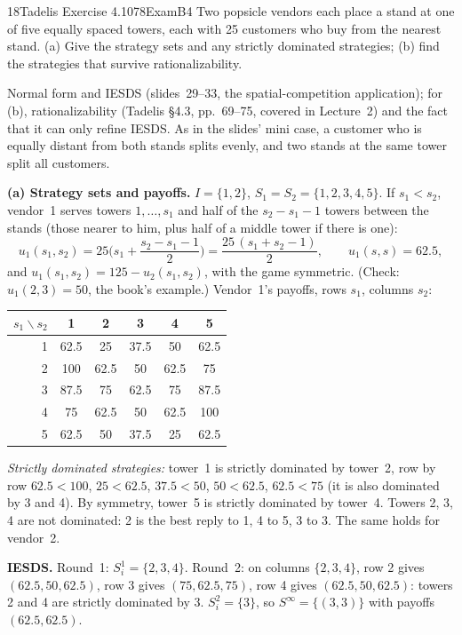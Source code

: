 \begin{exsol}{18}{Tadelis Exercise 4.10}{78}{Exam}{B4}
\asked Two popsicle vendors each place a stand at one of five equally spaced towers, each with
25 customers who buy from the nearest stand. (a) Give the strategy sets and any strictly
dominated strategies; (b) find the strategies that survive rationalizability.

\method Normal form and IESDS (slides~29--33, the spatial-competition application); for (b),
rationalizability (Tadelis \S4.3, pp.~69--75, covered in Lecture~2) and the fact that it can
only refine IESDS. As in the slides' mini case, a customer who is equally distant from both
stands splits evenly, and two stands at the same tower split all customers.

\solution
\textbf{(a) Strategy sets and payoffs.} $I = \{1, 2\}$, $S_1 = S_2 = \{1, 2, 3, 4, 5\}$. If
$s_1 < s_2$, vendor~1 serves towers $1, \dots, s_1$ and half of the $s_2 - s_1 - 1$ towers between
the stands (those nearer to him, plus half of a middle tower if there is one):
\[
  u_1(s_1, s_2) = 25\Big(s_1 + \frac{s_2 - s_1 - 1}{2}\Big) = \frac{25\,(s_1 + s_2 - 1)}{2},
  \qquad u_1(s,s) = 62.5,
\]
and $u_1(s_1,s_2) = 125 - u_2(s_1,s_2)$, with the game symmetric. (Check: $u_1(2,3) = 50$, the
book's example.) Vendor~1's payoffs, rows $s_1$, columns $s_2$:
\begin{center}
\begin{tabular}{r|ccccc}
$s_1 \backslash s_2$ & 1 & 2 & 3 & 4 & 5 \\ \hline
1 & 62.5 & 25 & 37.5 & 50 & 62.5 \\
2 & 100 & 62.5 & 50 & 62.5 & 75 \\
3 & 87.5 & 75 & 62.5 & 75 & 87.5 \\
4 & 75 & 62.5 & 50 & 62.5 & 100 \\
5 & 62.5 & 50 & 37.5 & 25 & 62.5
\end{tabular}
\end{center}
\emph{Strictly dominated strategies:} tower~1 is strictly dominated by tower~2, row by row
$62.5 < 100$, $25 < 62.5$, $37.5 < 50$, $50 < 62.5$, $62.5 < 75$ (it is also dominated by 3 and
4). By symmetry, tower~5 is strictly dominated by tower~4. Towers 2, 3, 4 are not dominated:
2 is the best reply to 1, 4 to 5, 3 to 3. The same holds for vendor~2.

\textbf{IESDS.} Round~1: $S_i^1 = \{2, 3, 4\}$. Round~2: on columns $\{2,3,4\}$, row 2 gives
$(62.5, 50, 62.5)$, row 3 gives $(75, 62.5, 75)$, row 4 gives $(62.5, 50, 62.5)$: towers 2 and 4
are strictly dominated by 3. $S_i^2 = \{3\}$, so $S^\infty = \{(3,3)\}$ with payoffs
$(62.5, 62.5)$.


\end{exsol}
